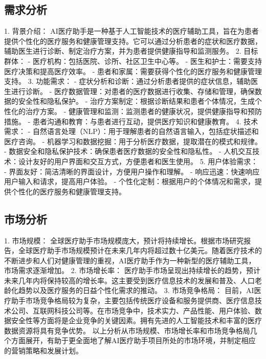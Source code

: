\subsection{需求分析}
1. 背景介绍：
AI医疗助手是一种基于人工智能技术的医疗辅助工具，旨在为患者提供个性化的医疗服务和健康管理支持。它可以通过分析患者的症状和医疗数据，辅助医生进行诊断、制定治疗方案，并为患者提供健康指导和监测服务。
2. 目标群体：
- 医疗机构：包括医院、诊所、社区卫生中心等。
- 医生和护士：需要支持医疗决策和提高医疗效率。
- 患者和家属：需要获得个性化的医疗服务和健康管理支持。
3. 功能需求：
- 症状分析和诊断：通过分析患者提供的症状信息，辅助医生进行诊断。
- 医疗数据管理：对患者的医疗数据进行收集、存储和管理，确保数据的安全性和隐私保护。
- 治疗方案制定：根据诊断结果和患者个体情况，生成个性化的治疗方案。
- 健康管理和监测：监测患者的健康状况，提供健康指导和预防措施。
- 患者沟通和教育：与患者进行互动，提供医疗知识和健康教育。
4. 技术需求：
- 自然语言处理（NLP）：用于理解患者的自然语言输入，包括症状描述和医疗咨询。
- 机器学习和数据挖掘：用于分析医疗数据，提取潜在的模式和规律。
- 数据安全和隐私保护技术：确保患者医疗数据的安全性和隐私性。
- 人机交互技术：设计友好的用户界面和交互方式，方便患者和医生使用。
5. 用户体验需求：
- 界面友好：简洁清晰的界面设计，方便用户操作和理解。
- 响应迅速：快速响应用户输入和请求，提高用户体验。
- 个性化定制：根据用户的个体情况和需求，提供个性化的医疗服务和健康管理支持。
\subsection{市场分析}
1. 市场规模：
全球医疗助手市场规模庞大，预计将持续增长。根据市场研究报告，全球医疗助手市场规模预计在未来几年内将超过数十亿美元。随着医疗技术的不断进步和人们对健康管理的重视，AI医疗助手作为一种新型的医疗辅助工具，市场需求逐渐增加。
2. 市场增长率：
医疗助手市场呈现出持续增长的趋势，预计未来几年内将保持较高的增长率。这主要受到医疗信息技术的发展和普及、人口老龄化趋势以及医疗服务的日益个性化需求的推动。
3. 市场竞争格局：
目前，AI医疗助手市场竞争格局较为复杂，主要包括传统医疗设备和服务提供商、医疗信息技术公司、互联网科技公司等。在市场竞争中，技术实力、产品性能、用户体验、数据安全性等方面将是企业竞争的关键因素。拥有先进的人工智能技术和丰富的医疗数据资源将具有竞争优势。
以上分析从市场规模、市场增长率和市场竞争格局几个方面展开，有助于更全面地了解AI医疗助手项目所处的市场环境，并制定相应的营销策略和发展计划。
